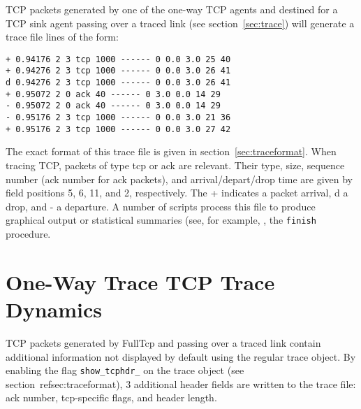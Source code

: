 TCP packets generated by one of the one-way TCP agents and destined for
a TCP sink agent
passing over a traced link (see section~\ref{sec:trace})
will generate a trace file lines of the form:
\begin{verbatim}
+ 0.94176 2 3 tcp 1000 ------ 0 0.0 3.0 25 40
+ 0.94276 2 3 tcp 1000 ------ 0 0.0 3.0 26 41
d 0.94276 2 3 tcp 1000 ------ 0 0.0 3.0 26 41
+ 0.95072 2 0 ack 40 ------ 0 3.0 0.0 14 29
- 0.95072 2 0 ack 40 ------ 0 3.0 0.0 14 29
- 0.95176 2 3 tcp 1000 ------ 0 0.0 3.0 21 36
+ 0.95176 2 3 tcp 1000 ------ 0 0.0 3.0 27 42
\end{verbatim}
The exact format of this trace file is given in section~\ref{sec:traceformat}.
When tracing TCP, packets of type {\sf tcp} or {\sf ack} are relevant.
Their type, size, sequence number (ack number for ack packets),
and arrival/depart/drop time are given by field positions
5, 6, 11, and 2, respectively.
The {\sf +} indicates a packet arrival, {\sf d} a drop, and {\sf -} a
departure.
A number of scripts process this file to produce graphical output or
statistical summaries (see,  for example, , the
{\tt finish} procedure.

\section{One-Way Trace TCP Trace Dynamics}
\label{sec:tcpdyn}

TCP packets generated by FullTcp and
passing over a traced link contain additional information not displayed
by default using the regular trace object.
By enabling the flag {\tt show\_tcphdr\_} on the trace object
(see section~ref{sec:traceformat}), 3 additional header fields are
written to the trace file: ack number, tcp-specific flags, and header length.

\endinput
